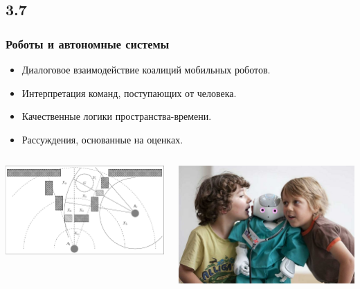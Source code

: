 \documentclass[default]{beamer}
\begin{document}
	\subsection{3.7}
	\begin{frame}
		\frametitle{Роботы и автономные системы}
		\Large
		\begin{itemize}
			\item Диалоговое взаимодействие коалиций мобильных роботов.
			\item Интерпретация команд, поступающих от человека.
			\item Качественные логики пространства-времени.
			\item Рассуждения, основанные на оценках.
		\end{itemize}
		\begin{columns}
			\begin{column}{0.45\textwidth}
				\includegraphics[width=\textwidth]{examples/representations/rita_ex_proc}
			\end{column}
			\begin{column}{0.45\textwidth}
				\includegraphics[width=\textwidth]{misc/presentations/nao_hri.jpg}
			\end{column}
		\end{columns}		
	\end{frame}
\end{document}
